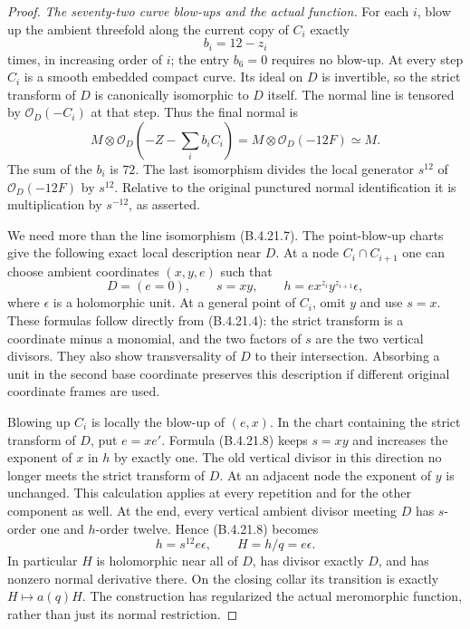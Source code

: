 \begin{proof}
\emph{The seventy-two curve blow-ups and the actual function.}
For each $i$, blow up the ambient threefold along the current
copy of $C_i$ exactly
\[
 b_i=12-z_i
\]
times, in increasing order of $i$; the entry $b_6=0$ requires
no blow-up.  At every step $C_i$ is a smooth embedded compact
curve.  Its ideal on $D$ is invertible, so the strict transform
of $D$ is canonically isomorphic to $D$ itself.  The normal
line is tensored by $\mathcal O_D(-C_i)$ at that step.
Thus the final normal is
\[
 M\otimes\mathcal O_D(-Z-\textstyle\sum_i b_iC_i)
   =M\otimes\mathcal O_D(-12F)\simeq M.
 \tag{B.4.21.7}
\]
The sum of the $b_i$ is $72$.
The last isomorphism divides the local generator $s^{12}$
of $\mathcal O_D(-12F)$ by $s^{12}$.  Relative to the
original punctured normal identification it is multiplication
by $s^{-12}$, as asserted.

We need more than the line isomorphism (B.4.21.7).
The point-blow-up charts give the following exact local
description near $D$.  At a node $C_i\cap C_{i+1}$ one can
choose ambient coordinates $(x,y,e)$ such that
\[
 D=(e=0),\qquad s=xy,\qquad
 h=e x^{z_i}y^{z_{i+1}}\epsilon,
 \tag{B.4.21.8}
\]
where $\epsilon$ is a holomorphic unit.  At a general point
of $C_i$, omit $y$ and use $s=x$.  These formulas follow
directly from (B.4.21.4): the strict transform is a coordinate
minus a monomial, and the two factors of $s$ are the two
vertical divisors.  They also show transversality of $D$ to
their intersection.  Absorbing a unit in the second base
coordinate preserves this description if different original
coordinate frames are used.

Blowing up $C_i$ is locally the blow-up of $(e,x)$.
In the chart containing the strict transform of $D$, put
$e=xe'$.  Formula (B.4.21.8) keeps $s=xy$ and increases
the exponent of $x$ in $h$ by exactly one.  The old vertical
divisor in this direction no longer meets the strict transform
of $D$.  At an adjacent node the exponent of $y$ is unchanged.
This calculation applies at every repetition and for the
other component as well.  At the end, every vertical ambient
divisor meeting $D$ has $s$-order one and $h$-order twelve.
Hence (B.4.21.8) becomes
\[
 h=s^{12}e\epsilon,
 \qquad H=h/q=e\epsilon.
 \tag{B.4.21.9}
\]
In particular $H$ is holomorphic near all of $D$, has divisor
exactly $D$, and has nonzero normal derivative there.  On the
closing collar its transition is exactly $H\mapsto a(q)H$.
The construction has regularized the actual meromorphic
function, rather than just its normal restriction.


\end{proof}
